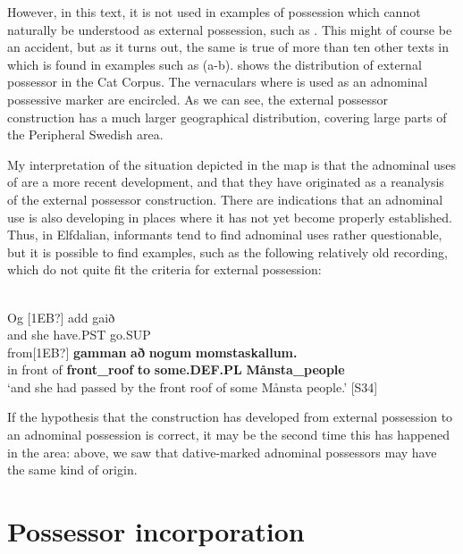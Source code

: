 However, in this text, it is not used in examples of possession which cannot naturally be understood as external possession, such as . This might of course be an accident, but as it turns out, the same is true of more than ten other texts in which  is found in examples such as (a-b).  shows the distribution of external possessor  in the Cat Corpus. The vernaculars where  is used as an adnominal possessive marker are encircled. As we can see, the external possessor construction has a much larger geographical distribution, covering large parts of the Peripheral Swedish area. 

My interpretation of the situation depicted in the map is that the adnominal uses of are a more recent development, and that they have originated as a reanalysis of the external possessor construction. There are indications that an adnominal use is also developing in places where it has not yet become properly established. Thus, in Elfdalian, informants tend to find adnominal uses rather questionable, but it is possible to find examples, such as the following relatively old recording, which do not quite fit the criteria for external possession: 

\ea\label{}
\\
\gll Og  [1EB?]  add  gaið\\
and  she  have.PST  go.SUP\\
\gll from[1EB?]  \textbf{gamman} \textbf{að} \textbf{nogum} \textbf{momstaskallum.}\\
in front of   \textbf{front\_roof} \textbf{to} \textbf{some.DEF.PL} \textbf{Månsta\_people}\\
\glt ‘and she had passed by the front roof of some Månsta people.’ [S34]
\z

If the hypothesis that the  construction has developed from external possession to an adnominal possession is correct, it may be the second time this has happened in the area: above, we saw that dative-marked adnominal possessors may have the same kind of origin. 

\section{Possessor incorporation}

